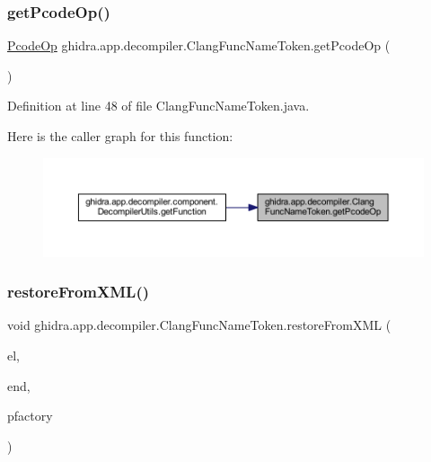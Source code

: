 \subsubsection{\texorpdfstring{getPcodeOp()}{getPcodeOp()}}
{\footnotesize\ttfamily \mbox{\hyperlink{class_pcode_op}{Pcode\+Op}} ghidra.\+app.\+decompiler.\+Clang\+Func\+Name\+Token.\+get\+Pcode\+Op (\begin{DoxyParamCaption}{ }\end{DoxyParamCaption})\hspace{0.3cm}{\ttfamily [inline]}}



Definition at line 48 of file Clang\+Func\+Name\+Token.\+java.

Here is the caller graph for this function\+:
\nopagebreak
\begin{figure}[H]
\begin{center}
\leavevmode
\includegraphics[width=350pt]{classghidra_1_1app_1_1decompiler_1_1_clang_func_name_token_a1ad70f0e4af3cac359c3a77fbfda3c58_icgraph}
\end{center}
\end{figure}
\mbox{\label{classghidra_1_1app_1_1decompiler_1_1_clang_func_name_token_a08018f62d0ccf7f7df70fd4d589f9520}} 
\subsubsection{\texorpdfstring{restoreFromXML()}{restoreFromXML()}}
{\footnotesize\ttfamily void ghidra.\+app.\+decompiler.\+Clang\+Func\+Name\+Token.\+restore\+From\+X\+ML (\begin{DoxyParamCaption}\item[{Xml\+Element}]{el,  }\item[{Xml\+Element}]{end,  }\item[{Pcode\+Factory}]{pfactory }\end{DoxyParamCaption})\hspace{0.3cm}{\ttfamily [inline]}}



